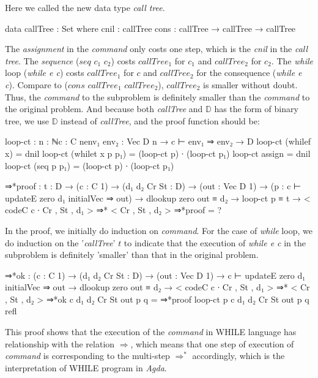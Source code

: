 \documentclass{jfrarticle}
\newcommand{\md}[1]{$\mathds{#1}$}
\begin{document}
Here we called the new data type \textit{call tree}.
\begin{code}[fontsize=\small]
data callTree : Set where
  cnil : callTree 
  cons : callTree → callTree → callTree
\end{code}
The \textit{assignment} in the \textit{command} only costs one  step, which is the \textit{cnil} in the \textit{call tree}.
The \textit{sequence} ($seq$ $c_1$ $c_2$) costs $callTree_1$ for $c_1$ and $callTree_2$ for $c_2$.
The \textit{while} loop (\textit{while e c}) costs $callTree_1$ for $c$ and $callTree_2$ for the consequence (\textit{while e c}).
Compare to ($cons$ $callTree_1$ $callTree_2$), $callTree_2$ is smaller without doubt.
Thus, the \textit{command} to the subproblem is definitely smaller than the \textit{command} to the original problem.
And because both \textit{callTree} and \md{D} has the form of binary tree, we use \md{D} instead of \textit{callTree}, and the proof function should be:
\begin{code}[fontsize=\small]
loop-ct : {n : ℕ}{c : C n}{env₁ env₂ : Vec D n} → c ⊢ env₁ ⇒ env₂ → D
loop-ct (whilef x) = dnil
loop-ct (whilet x p p₁) = (loop-ct p) ∙ (loop-ct p₁)
loop-ct assign = dnil
loop-ct (seq p p₁) = (loop-ct p) ∙ (loop-ct p₁)

⇒*proof : {t : D} → (c : C 1) → (d₁ d₂ Cr St : D) → (out : Vec D 1)
       → (p : c ⊢ updateE zero d₁ initialVec ⇒ out)
       → dlookup zero out ≡ d₂
       → loop-ct p ≡ t
       → < codeC c ∙ Cr , St , d₁ > ⇒* < Cr , St , d₂ >
⇒*proof = ?
\end{code}
In the proof, we initially do induction on \textit{command}.
For the case of \textit{while} loop, we do induction on the '\textit{callTree}' $t$ to indicate that the execution of \textit{while e c} in the subproblem is definitely 'smaller' than that in the original problem. 
\begin{code}[fontsize=\small]
⇒*ok : (c : C 1) → (d₁ d₂ Cr St : D) → (out : Vec D 1)
       → c ⊢ updateE zero d₁ initialVec ⇒ out
       → dlookup zero out ≡ d₂
       → < codeC c ∙ Cr , St , d₁ > ⇒* < Cr , St , d₂ >
⇒*ok c d₁ d₂ Cr St out p q = ⇒*proof {loop-ct p} c d₁ d₂ Cr St out p q refl
\end{code}
This proof shows that the execution of the \textit{command} in WHILE language has relationship with the relation $\Rightarrow$, which means that one step of execution of \textit{command} is corresponding to the multi-step $\Rightarrow^*$ accordingly, which is the interpretation of WHILE program in \textit{Agda}.\\\\
\end{document}

